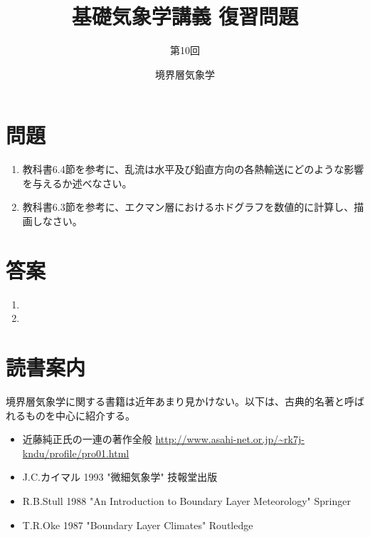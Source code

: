 \documentclass{jsarticle}
\newenvironment{problems}
{
  \renewcommand\labelenumi{\doublebox{\arabic{enumi}}}
  \begin{enumerate}
}{
  \end{enumerate}
  \renewcommand\labelenumi{\arabic{enumi}.}
}
\begin{document}
\title{基礎気象学講義 復習問題} %
\author{第10回} %
\date{境界層気象学} %
\maketitle

\section{問題}

    \begin{problems}
    \item 教科書6.4節を参考に、乱流は水平及び鉛直方向の各熱輸送にどのような影響を与えるか述べなさい。\\

    \item 教科書6.3節を参考に、エクマン層におけるホドグラフを数値的に計算し、描画しなさい。

\end{problems}

\section{答案}
\begin{problems}
\item 

\item 


\end{problems}

\section{読書案内}
境界層気象学に関する書籍は近年あまり見かけない。以下は、古典的名著と呼ばれるものを中心に紹介する。
\begin{itemize}
\item 近藤純正氏の一連の著作全般 \url{http://www.asahi-net.or.jp/~rk7j-kndu/profile/pro01.html}
\item J.C.カイマル 1993 "微細気象学" 技報堂出版
\item R.B.Stull 1988 "An Introduction to Boundary Layer Meteorology" Springer
\item T.R.Oke 1987 "Boundary Layer Climates" Routledge
\end{itemize}
\end{document}
